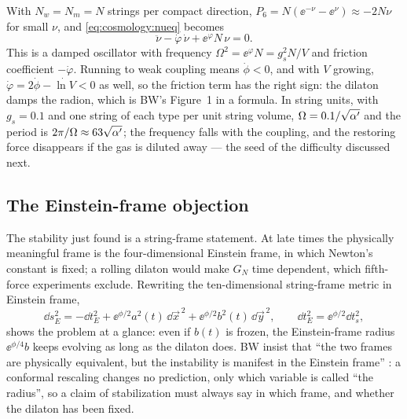 \begin{example}\label{ex:cosmology:radion}
With $N_w=N_m=N$ strings per compact direction, $P_6=N(\ee^{-\nu}-\ee^{\nu})\approx-2N\nu$ for
small $\nu$, and \eqref{eq:cosmology:nueq} becomes
\begin{equation}\label{eq:cosmology:radionosc}
 \ddot\nu-\dot\varphi\,\dot\nu+\ee^{\varphi}N\,\nu=0 .
\end{equation}
This is a damped oscillator with frequency $\Omega^2=\ee^{\varphi}N=g_s^2N/V$ and friction
coefficient $-\dot\varphi$. Running to weak coupling means $\dot\phi<0$, and with $V$
growing, $\dot\varphi=2\dot\phi-\dot{\ln V}<0$ as well, so the friction term has the right
sign: the dilaton damps the radion, which is BW's Figure~1 in a formula. In string units,
with $g_s=0.1$ and one string of each type per unit string volume, $\Omega=0.1/\sqrt{\alpha'}$
and the period is $2\pi/\Omega\approx63\sqrt{\alpha'}$; the frequency falls with the coupling,
and the restoring force disappears if the gas is diluted away --- the seed of the difficulty
discussed next.
\end{example}

\subsection{The Einstein-frame objection}

The stability just found is a string-frame statement. At late times the physically
meaningful frame is the four-dimensional Einstein frame, in which Newton's constant is fixed;
a rolling dilaton would make $G_N$ time dependent, which fifth-force experiments exclude.
 Rewriting the ten-dimensional string-frame metric in
Einstein frame, 
\begin{equation}\label{eq:cosmology:einsteinframe}
 \dd s_E^2=-\dd t_E^2+\ee^{\phi/2}a^2(t)\,\dd\vec x^{\,2}+\ee^{\phi/2}b^2(t)\,\dd\vec y^{\,2},
 \qquad \dd t_E^2=\ee^{\phi/2}\dd t_s^2 ,
\end{equation}
shows the problem at a glance: even if $b(t)$ is frozen, the Einstein-frame radius
$\ee^{\phi/4}b$ keeps evolving as long as the dilaton does. BW insist that ``the two frames
are physically equivalent, but the instability is manifest in the Einstein frame''
: a conformal rescaling changes no prediction, only which
variable is called ``the radius'', so a claim of
stabilization must always say in which frame, and whether the dilaton has been fixed.

